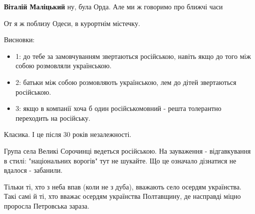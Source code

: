 \begin{itemize}
\begin{itemize}
\textbf{Віталій Маліцький} ну, була Орда. Але ми ж говоримо про ближчі часи

\end{itemize}

 

От я ж поблизу Одеси, в курортнім містечку.

Висновки:

\begin{itemize}
  \item 1: до тебе за замовчуванням звертаються російською, навіть якщо до того між собою розмовляли українською.
  \item 2: батьки між собою розмовляють українською, лем до дітей звертаються російською.
  \item 3: якщо в компанії хоча б один російськомовний - решта толерантно переходить на російську.
\end{itemize}

\begin{itemize}
 
Класика. І це після 30 років незалежності.
\end{itemize}

 

Група села Великі Сорочинці ведеться російською. На зауваження - відгавкування
в стилі: "національних ворогів" тут не шукайте. Що це означало дізнатися не
вдалося - забанили.

\begin{itemize}
 

Тільки ті, хто з неба впав (коли не з дуба), вважають село осердям українства.
Такі самі й ті, хто вважає осердям українства Полтавщину, де насправді міцно
проросла Петровська зараза.



\end{itemize}
\end{itemize}
